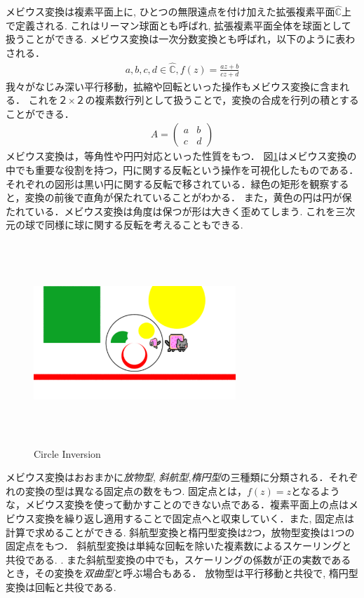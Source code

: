 メビウス変換は複素平面上に, ひとつの無限遠点を付け加えた拡張複素平面$\hat{\mathbb{C}}$上で定義される.
これはリーマン球面とも呼ばれ, 拡張複素平面全体を球面として扱うことができる. 
メビウス変換は一次分数変換とも呼ばれ，以下のように表わされる．
\begin{eqnarray*}
 a, b, c, d\in \hat{\mathbb{C}}, f(z) = \frac{az + b}{cz + d}
\end{eqnarray*}
我々がなじみ深い平行移動，拡縮や回転といった操作もメビウス変換に含まれる．
これを２×２の複素数行列として扱うことで，変換の合成を行列の積とすることができる．
\begin{eqnarray*}
  A = \left(
    \begin{array}{ccc}
      a & b \\
      c & d
    \end{array}
  \right)
\end{eqnarray*}
メビウス変換は，等角性や円円対応といった性質をもつ．
図\ref{fig:circleInversion}はメビウス変換の中でも重要な役割を持つ，円に関する反転という操作を可視化したものである．
それぞれの図形は黒い円に関する反転で移されている．緑色の矩形を観察すると，変換の前後で直角が保たれていることがわかる．
また，黄色の円は円が保たれている．メビウス変換は角度は保つが形は大きく歪めてしまう. 
これを三次元の球で同様に球に関する反転を考えることもできる.
\begin{figure}[htbp]
 \begin{center}
      \includegraphics[width=3in, height=3in, keepaspectratio]{../img/klein/circleInversion.pdf}
    \caption{Circle Inversion}
    \label{fig:circleInversion}
 \end{center}
\end{figure}

メビウス変換はおおまかに\emph{放物型}, \emph{斜航型},\emph{楕円型}の三種類に分類される．それぞれの変換の型は異なる固定点の数をもつ.
固定点とは，$f(z) = z$となるような，メビウス変換を使って動かすことのできない点である．複素平面上の点はメビウス変換を繰り返し適用することで固定点へと収束していく．また, 固定点は計算で求めることができる.
斜航型変換と楕円型変換は2つ，放物型変換は1つの固定点をもつ．
斜航型変換は単純な回転を除いた複素数によるスケーリングと共役である. .
また斜航型変換の中でも，スケーリングの係数が正の実数であるとき，その変換を\emph{双曲型}と呼ぶ場合もある．
放物型は平行移動と共役で, 楕円型変換は回転と共役である. 

